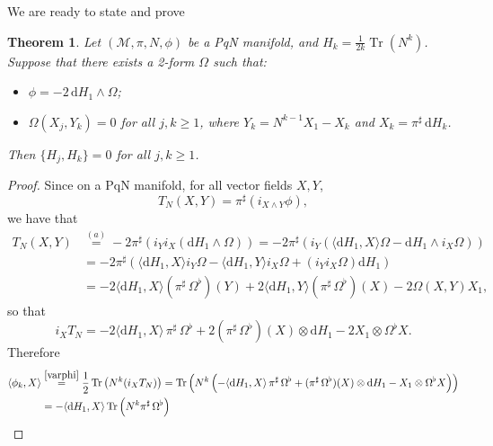 \documentclass[12pt]{article}
\newtheorem{theorem}{Theorem}%
\def\d{{\mathrm d}}
\def\parpo#1#2{\{#1,#2\}}
\newcommand{\brke}[2]{{{\langle #1,#2\rangle}}}
\def\M{{\mathcal M}}
\def\Tr{\operatorname{Tr}}
\begin{document}
We are ready to state and prove 
\begin{theorem} 
\label{thm:involution}
Let $(\M,\pi,N,\phi)$ be a PqN manifold,  
and $H_k=\frac1{2k}\Tr({N}^k)$. Suppose that there exists a 2-form $\Omega$ such that:
\begin{itemize}
\item[$(a)$] $\phi=-2\,\d H_1\wedge\Omega$; 
\item[$(b)$] $\Omega(X_j,{Y_k})=0$ for all $j,k\ge 1$, where $Y_k=N^{k-1}X_1-X_k$ and $X_k=\pi^\sharp\,\d H_k$.
\end{itemize}
Then %
$\parpo{H_j}{H_k}=0$ for all $j,k\ge 1$. 
\end{theorem}
\begin{proof} Since on a PqN manifold, for all vector fields $X,Y$, 
\begin{equation}
\label{eq:pre-ThatN}
T_{N}(X,Y)=\pi^\sharp(i_{X\wedge Y}\phi),
\end{equation}
we have that
\begin{equation}
\label{eq:ThatN}
\begin{split}
T_{N}(X,Y)& %
\stackrel{(a)}{=}-2\pi^\sharp(i_Yi_X (\d H_1\wedge\Omega))
=-2\pi^\sharp(i_Y(\langle \d H_1,X\rangle\Omega-\d H_1\wedge i_X\Omega))\\
&=-2\pi^\sharp(\langle \d H_1,X\rangle i_Y\Omega-\langle \d H_1,Y\rangle i_X\Omega+(i_Yi_X\Omega) \d H_1)\\
&=-2\langle \d H_1,X\rangle(\pi^\sharp\,\Omega^\flat)(Y)+2\langle \d H_1,Y\rangle(\pi^\sharp\,\Omega^\flat)(X)-2\Omega(X,Y)X_1,
\end{split}
\end{equation}
so that 
\begin{equation}
\label{eq:5}
i_XT_{N}=-2\langle \d H_1,X\rangle\,\pi^\sharp\,\Omega^\flat
+2(\pi^\sharp\,\Omega^\flat)(X)\otimes \d H_1-2X_1\otimes \Omega^\flat X.
\end{equation}
Therefore %
\begin{equation}
\label{eq-pre-tr}
\begin{split}
\brke{\phi_k}{X} &\stackrel{\eqref{varphi}}{=}\frac12\Tr\left({N}^k(i_{X}T_{N})\right)
=%
\Tr\left({N}^k\left(-\langle \d H_1,X\rangle\,\pi^\sharp\,\Omega^\flat
+(\pi^\sharp\,\Omega^\flat)  (X)\otimes \d H_1
-X_1\otimes \Omega^\flat X\right)\right)\\
&=-%
\langle \d H_1,X\rangle\Tr\left({N}^k\pi^\sharp\,\Omega^\flat\right)

\end{split}
\end{equation}
\end{proof}
\end{document}
